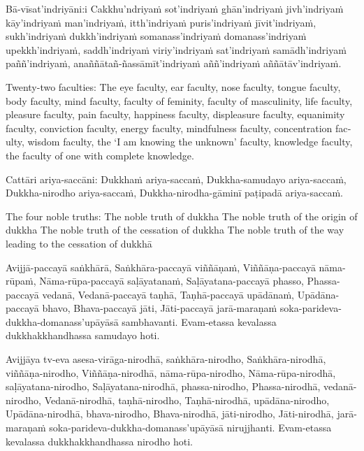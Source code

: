 Bā-vīsat’indriyāni:i
Cakkhu’ndriyaṁ sot’indriyaṁ ghān’indriyaṁ
jivh’indriyaṁ kāy’indriyaṁ man’indriyaṁ,
itth’indriyaṁ puris’indriyaṁ jīvit’indriyaṁ,
sukh’indriyaṁ dukkh’indriyaṁ
somanass’indriyaṁ domanass’indriyaṁ upekkh’indriyaṁ,
saddh’indriyaṁ viriy’indriyaṁ sat’indriyaṁ
samādh’indriyaṁ paññ’indriyaṁ,
anaññātañ-ñassāmīt’indriyaṁ aññ’indriyaṁ aññātāv’indriyaṁ.

\begin{english}
  Twenty-two faculties: The eye faculty, ear faculty, nose faculty, tongue faculty, body faculty, mind faculty, faculty of feminity, faculty of masculinity, life faculty, pleasure faculty, pain faculty, happiness faculty, displeasure faculty, equanimity faculty, conviction faculty, energy faculty, mindfulness faculty, concentration faculty, wisdom faculty, the ‘I am knowing the unknown’ faculty, knowledge faculty, the faculty of one with complete knowledge.
\end{english}

\suttaRef{[Vibh]}

Cattāri ariya-saccāni:
Dukkhaṁ ariya-saccaṁ,
Dukkha-samudayo ariya-saccaṁ,
Dukkha-nirodho ariya-saccaṁ,
Dukkha-nirodha-gāminī paṭipadā ariya-saccaṁ.

\begin{english}
  The four noble truths:
  The noble truth of dukkha
  The noble truth of the origin of dukkha
  The noble truth of the cessation of dukkha
  The noble truth of the way leading to the cessation of dukkhā
\end{english}

\suttaRef{[SN 56.24]}

Avijjā-paccayā saṅkhārā,
Saṅkhāra-paccayā viññāṇaṁ,
Viññāṇa-paccayā nāma-rūpaṁ,
Nāma-rūpa-paccayā saḷāyatanaṁ,
Saḷāyatana-paccayā phasso,
Phassa-paccayā vedanā,
Vedanā-paccayā taṇhā,
Taṇhā-paccayā upādānaṁ,
Upādāna-paccayā bhavo,
Bhava-paccayā jāti,
Jāti-paccayā jarā-maraṇaṁ soka-parideva-dukkha-domanass’upāyāsā sambhavanti.
Evam-etassa kevalassa dukkhakkhandhassa samudayo hoti.

Avijjāya tv-eva asesa-virāga-nirodhā, saṅkhāra-nirodho,
Saṅkhāra-nirodhā, viññāṇa-nirodho,
Viññāṇa-nirodhā, nāma-rūpa-nirodho,
Nāma-rūpa-nirodhā, saḷāyatana-nirodho,
Saḷāyatana-nirodhā, phassa-nirodho,
Phassa-nirodhā, vedanā-nirodho,
Vedanā-nirodhā, taṇhā-nirodho,
Taṇhā-nirodhā, upādāna-nirodho,
Upādāna-nirodhā, bhava-nirodho,
Bhava-nirodhā, jāti-nirodho,
Jāti-nirodhā, jarā-maraṇaṁ soka-parideva-dukkha-domanass’upāyāsā nirujjhanti.
Evam-etassa kevalassa dukkhakkhandhassa nirodho hoti.

